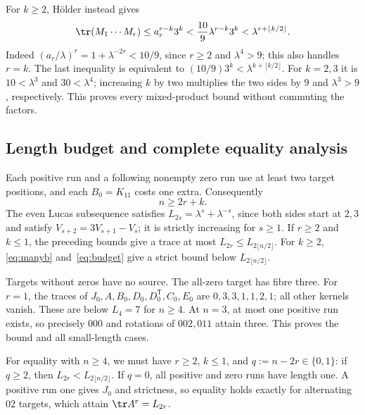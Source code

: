 For $k\ge2$, Hölder instead gives
\begin{equation}\label{eq:manyb}
 \tr(M_1\cdots M_r)\le a_r^{r-k}3^k
 <\frac{10}{9}\lambda^{r-k}3^k
 <\lambda^{r+\lfloor k/2\rfloor}.
\end{equation}
Indeed $(a_r/\lambda)^r=1+\lambda^{-2r}<10/9$, since
$r\ge2$ and $\lambda^4>9$; this also handles $r=k$.
The last inequality is equivalent to
$(10/9)3^k<\lambda^{k+\lfloor k/2\rfloor}$. For $k=2,3$ it is
$10<\lambda^3$ and $30<\lambda^4$; increasing $k$ by two multiplies
the two sides by $9$ and $\lambda^3>9$, respectively. This proves
every mixed-product bound without commuting the factors.

\subsection{Length budget and complete equality analysis}
Each positive run and a following nonempty zero run use at least two
target positions, and each $B_0=K_{11}$ costs one extra. Consequently
\begin{equation}\label{eq:budget}
 n\ge2r+k.
\end{equation}
The even Lucas subsequence satisfies
$L_{2s}=\lambda^s+\lambda^{-s}$, since both sides start at $2,3$
and satisfy $V_{s+2}=3V_{s+1}-V_s$; it is strictly increasing for
$s\ge1$. If $r\ge2$ and $k\le1$, the preceding bounds give a
trace at most $L_{2r}\le L_{2\lfloor n/2\rfloor}$. For $k\ge2$,
\eqref{eq:manyb} and~\eqref{eq:budget} give a strict bound below
$L_{2\lfloor n/2\rfloor}$.

Targets without zeros have no source. The all-zero target has fibre
three. For $r=1$, the traces of $J_0,A,B_0,D_0,D_0^{\mathsf T},C_0,E_0$
are $0,3,3,1,1,2,1$; all other kernels vanish. These are below
$L_4=7$ for $n\ge4$. At $n=3$, at most one positive run exists,
so precisely $000$ and rotations of $002,011$ attain three. This
proves the bound and all small-length cases.

For equality with $n\ge4$, we must have $r\ge2$, $k\le1$, and
$q:=n-2r\in\{0,1\}$: if $q\ge2$, then
$L_{2r}<L_{2\lfloor n/2\rfloor}$. If $q=0$, all positive and zero
runs have length one. A positive run one gives $J_0$ and strictness,
so equality holds exactly for alternating $02$ targets, which attain
$\tr A^r=L_{2r}$.

